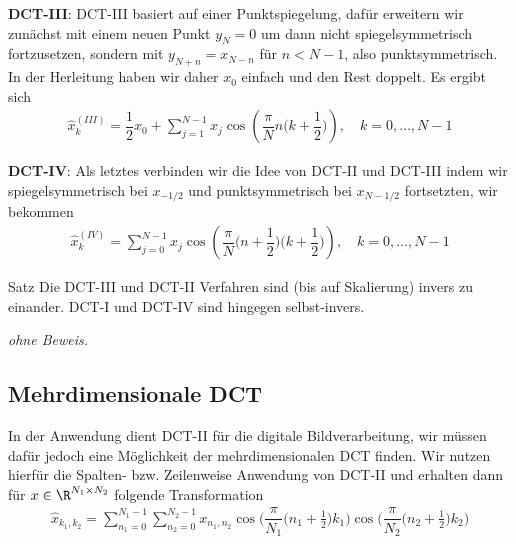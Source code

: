 \textbf{DCT-III}:
DCT-III basiert auf einer Punktspiegelung, dafür erweitern wir zunächst mit einem neuen Punkt $y_N=0$ um dann nicht 
spiegelsymmetrisch fortzusetzen, sondern mit $y_{N+n} = x_{N-n}$ für $n<N-1$, also punktsymmetrisch. 
In der Herleitung haben wir daher $x_0$ einfach und den Rest doppelt. Es ergibt sich
%
\begin{align*}
  \hat{x}^{(III)}_k 
  = \dfrac{1}{2}x_0 + \sum_{j=1}^{N-1} x_j \cos\left(\dfrac{\pi}{N}n\Big(k+\dfrac{1}{2}\Big)\right), 
  \quad k=0,\dots,N-1
  \tag{III}\label{eq:DCTIIIeq}
\end{align*}
%

\textbf{DCT-IV}:
Als letztes verbinden wir die Idee von DCT-II und DCT-III indem wir spiegelsymmetrisch bei $x_{-1/2}$ und punktsymmetrisch
bei $x_{N-1/2}$ fortsetzten, wir bekommen
%
\begin{align*}
  \hat{x}^{(IV)}_k 
  = \sum_{j=0}^{N-1} x_j \cos\left(\dfrac{\pi}{N}\Big(n+\dfrac{1}{2}\Big)\Big(k+\dfrac{1}{2}\Big)\right), 
  \quad k=0,\dots,N-1
  \tag{IV}\label{eq:DCTIVeq}
\end{align*}
%

\begin{center}
  
\end{center}
\begin{center}
  
\end{center}
\begin{center}
  
\end{center}
\begin{center}
  
\end{center}

\begin{colbox}{Satz}
  Die DCT-III und DCT-II Verfahren sind (bis auf Skalierung) invers zu einander. DCT-I und DCT-IV sind hingegen 
  selbst-invers.
\end{colbox}
\textit{ohne Beweis.}

\subsection{Mehrdimensionale DCT}
In der Anwendung dient DCT-II für die digitale Bildverarbeitung, wir müssen dafür jedoch eine Möglichkeit der 
mehrdimensionalen DCT finden. Wir nutzen hierfür die Spalten- bzw. Zeilenweise Anwendung von DCT-II und 
erhalten dann für $x\in\R^{N_1\times N_2}$ folgende Transformation
\begin{align*}
  \hat{x}_{k_1,k_2}
  = \sum_{n_1=0}^{N_1-1} \sum_{n_2=0}^{N_2-1}
  x_{n_1,n_2}
  \cos\Big(\dfrac{\pi}{N_1}\big(n_1+\tfrac{1}{2}\big)k_1\Big)
  \cos\Big(\dfrac{\pi}{N_2}\big(n_2+\tfrac{1}{2}\big)k_2\Big)
\end{align*}

